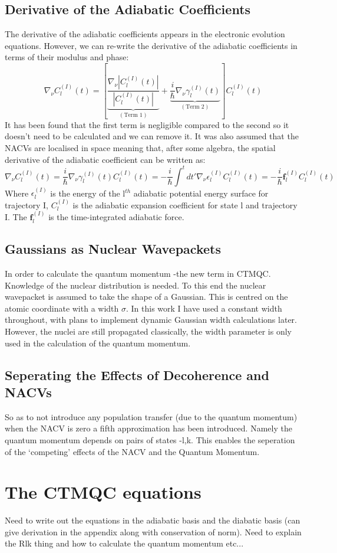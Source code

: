 \subsection{Derivative of the Adiabatic Coefficients}
The derivative of the adiabatic coefficients appears in the electronic evolution equations. However, we can re-write the derivative of the adiabatic coefficients in terms of their modulus and phase:
\begin{equation}
  \nabla_{\nu} C_{l}^{(I)}(t) = \left[ \underbrace{\frac{\nabla_{\nu} |C_{l}^{(I)}(t)|}{|C_{l}^{(I)}(t)|}}_{(\text{Term 1})} + \underbrace{\frac{i}{\hbar} \nabla_{\nu} \gamma_{l}^{(I)}(t)}_{(\text{Term 2})}\right] C_{l}^{(I)}(t)
\end{equation}
It has been found that the first term is negligible compared to the second \cite{abedi_dynamical_2013, agostini_mixed_2013, agostini_exact_2015} so it doesn't need to be calculated and we can remove it. It was also assumed that the NACVs are localised in space meaning that, after some algebra, the spatial derivative of the adiabatic coefficient can be written as:
\begin{equation}
  \nabla_{\nu} C_{l}^{(I)}(t) = \frac{i}{\hbar} \nabla_{\nu} \gamma_{l}^{(I)}(t) C_{l}^{(I)}(t) = -\frac{i}{\hbar} \int^{t} dt' \nabla_{\nu} \epsilon_{l}^{(I)} C_{l}^{(I)}(t) = -\frac{i}{\hbar} \textbf{f}_{l}^{(I)} C_{l}^{(I)}(t)
\end{equation}
Where $\epsilon_{l}^{(I)}$ is the energy of the l$^{th}$ adiabatic potential energy surface for trajectory I, $C_{l}^{(I)}$ is the adiabatic expansion coefficient for state l and trajectory I. The $\textbf{f}_{l}^{(I)}$ is the time-integrated adiabatic force.
\subsection{Gaussians as Nuclear Wavepackets}
In order to calculate the quantum momentum -the new term in CTMQC. Knowledge of the nuclear distribution is needed. To this end the nuclear wavepacket is assumed to take the shape of a Gaussian. This is centred on the atomic coordinate with a width $\sigma$. In this work I have used a constant width throughout, with plans to implement dynamic Gaussian width calculations later. However, the nuclei are still propagated classically, the width parameter is only used in the calculation of the quantum momentum.
\subsection{Seperating the Effects of Decoherence and NACVs}
So as to not introduce any population transfer (due to the quantum momentum) when the NACV is zero a fifth approximation has been introduced. Namely the quantum momentum depends on pairs of states -l,k. This enables the seperation of the `competing' effects of the NACV and the Quantum Momentum.
\section{The CTMQC equations}
{\Large Need to write out the equations in the adiabatic basis and the diabatic basis (can give derivation in the appendix along with conservation of norm). Need to explain the Rlk thing and how to calculate the quantum momentum etc... }
